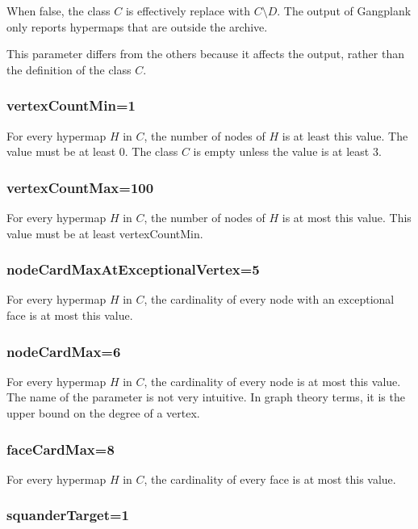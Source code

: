When false, the class $C$ is effectively replace with $C\setminus D$.  The output
of Gangplank only reports hypermaps that are outside the archive.

This parameter differs from the others because it affects the output, rather than the
definition of the class $C$.

\subsubsection{vertexCountMin=1}

For every hypermap $H$ in $C$, the number of nodes of $H$ is at least this value.
The value must be at least $0$.  The class $C$ is empty unless the value is at least $3$.

\subsubsection{vertexCountMax=100}

For every hypermap $H$ in $C$, the number of nodes of $H$ is at most this value.
This value must be at least vertexCountMin.

\subsubsection{nodeCardMaxAtExceptionalVertex=5}

For every hypermap $H$ in $C$, the cardinality of every node with an exceptional face
is at most this value.

\subsubsection{nodeCardMax=6}

For every hypermap $H$ in $C$, the cardinality of every node is at most
this value.  The name of the parameter is not very intuitive.  In
graph theory terms, it is the upper bound on the degree of a vertex.

\subsubsection{faceCardMax=8}

For every hypermap $H$ in $C$, the cardinality of every face is at most
this value.  

\subsubsection{squanderTarget=1}


